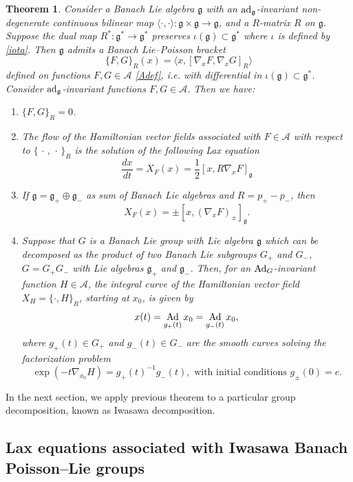\documentclass[a4paper,12pt,reqno]{amsart}%
\newtheorem{theorem}{Theorem}
\theoremstyle{definition}
\theoremstyle{remark}
\numberwithin{theorem}{section}
\numberwithin{equation}{section}
\newcommand{\1}{{\bf 1}}
\newcommand{\pb}{\{\,\cdot\,,\,\cdot\,\}}
\DeclareMathOperator{\ad}{\textnormal{ad}}
\DeclareMathOperator{\Ad}{\textnormal{Ad}}
\newcommand{\g}{{\mathfrak g}}
\begin{document}
\begin{theorem}\label{thm:aks_on_G}
Consider a Banach Lie  algebra $\g$ with an $\ad_\g$-invariant non-degenerate continuous bilinear map
$\langle\cdot, \cdot\rangle: \g \times \g\rightarrow \g$, and a $R$-matrix $R$ on $\g$.
    Suppose 
    the dual map $R^*:\g^*\to\g^*$ preserves $\iota(\g)\subset\g^*$ where $\iota$ is defined by \eqref{iota}.
    Then $\g$ admits a Banach Lie--Poisson bracket 
\begin{equation}\label{pb-R}
\{ F, G \}_R(x) = \langle x, [\nabla_xF, \nabla_x G]_R \rangle
\end{equation}
defined on functions $F, G\in\mathcal{A}$ \eqref{Adef}, i.e. with differential in $\iota(\g)\subset\g^*$.
    Consider $\ad_\g$-invariant functions $F,G\in \mathcal{A}$.
    Then we have:
    \begin{enumerate}
    \item[(1)] $\{F,G\}_R = 0$.
    \item[(2)] The flow of the Hamiltonian vector fields associated with $F\in \mathcal{A}$ with respect to $\pb_R$ is the solution of the following Lax equation
    \[
    \frac{d x}{dt}  = X_F(x) =  \frac{1}{2}\left[x, R \nabla_x F\right]_\g
    \]
    \item[(2')] If $\g = \g_+\oplus \g_-$ as sum of Banach Lie algebras and  $R = p_+ - p_-$, then 
    \[
    X_F(x) =   \pm \left[x, \left(\nabla_x F\right)_\pm\right]_\g.
    \]
    \item[(3)] Suppose that $G$ is a Banach Lie group with Lie algebra $\g$ which can be decomposed as the product of two Banach Lie subgroups $G_+$ and $G_-$, $G = G_+G_-$ with Lie algebras $\g_+$ and $\g_-$. Then, for  an $\Ad_G$-invariant function $H\in \mathcal{A}$, the integral curve of the Hamiltonian vector field $X_H = \{\cdot, H\}_R$, starting at $x_0$, is given by
    \[
    x(t) = \Ad_{g_+(t)}x_0 = \Ad_{g_-(t)}x_0,
    \]
    where $g_+(t)\in G_+$ and $g_-(t)\in G_-$ are the smooth curves solving the factorization problem
    \begin{equation}\label{factorisation-R}
    \exp(-t \nabla_{x_0}H) = g_+(t)^{-1} g_-(t), \textrm{  with initial conditions } g_\pm(0) = e.
    \end{equation}
\end{enumerate}
\end{theorem}


In the next section, we apply previous theorem to a particular group decomposition, known as Iwasawa decomposition.

\subsection{Lax equations associated with Iwasawa Banach Poisson--Lie groups}\label{Iwasawa_infinite}
\end{document}
